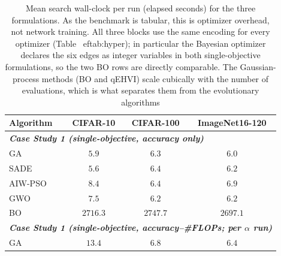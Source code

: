 \documentclass[runningheads]{llncs}
\begin{document}
\begin{table}[!ht]
\centering
\caption{Mean search wall-clock per run (elapsed seconds) for the three formulations. As the benchmark is tabular, this is optimizer overhead, not network training. All three blocks use the same encoding for every optimizer (Table~
ef{tab:hyper}); in particular the Bayesian optimizer declares the six edges as integer variables in both single-objective formulations, so the two BO rows are directly comparable. The Gaussian-process methods (BO and qEHVI) scale cubically with the number of evaluations, which is what separates them from the evolutionary algorithms}
\label{tab:time}
\begin{tabular}{lccc}
\toprule
\textbf{Algorithm} & \hspace{5mm} \textbf{CIFAR-10} & \hspace{5mm}  \textbf{CIFAR-100} & \hspace{5mm}  \textbf{ImageNet16-120} \\
\midrule
\multicolumn{4}{l}{\textit{\textbf{Case Study 1 (single-objective, accuracy only)}}} \\
GA      & \hspace{5mm} $5.9$ & \hspace{5mm} $6.3$ & \hspace{5mm} $6.0$ \\
SADE    & \hspace{5mm} $5.6$ & \hspace{5mm} $6.4$ & \hspace{5mm} $6.2$ \\
AIW-PSO & \hspace{5mm} $8.4$ & \hspace{5mm} $6.4$ & \hspace{5mm} $6.9$ \\
GWO     & \hspace{5mm} $7.5$ & \hspace{5mm} $6.2$ & \hspace{5mm} $6.2$ \\
BO      & \hspace{5mm} $2716.3$ & \hspace{5mm} $2747.7$ & \hspace{5mm} $2697.1$ \\
\midrule
\multicolumn{4}{l}{\textit{\textbf{Case Study 1 (single-objective, accuracy--\#FLOPs; per $\alpha$ run)}}} \\
GA      & \hspace{5mm} $13.4$ & \hspace{5mm} $6.8$ & \hspace{5mm} $6.4$ \\

\end{tabular}
\end{table}
\end{document}
